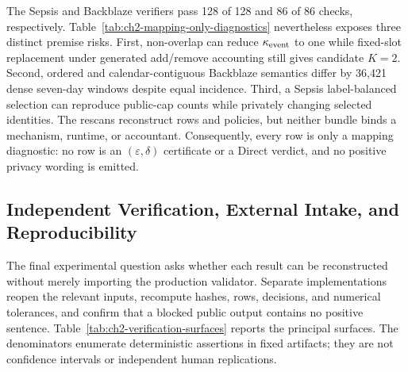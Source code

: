 The Sepsis and Backblaze verifiers pass 128 of 128 and 86 of 86 checks,
respectively.  Table~\ref{tab:ch2-mapping-only-diagnostics} nevertheless exposes
three distinct premise risks.  First, non-overlap can reduce
\(\kappa_{\mathrm{event}}\) to one while fixed-slot replacement under generated
add/remove accounting still gives candidate \(K=2\).  Second, ordered and
calendar-contiguous Backblaze semantics differ by 36,421 dense seven-day windows
despite equal incidence.  Third, a Sepsis label-balanced selection can reproduce
public-cap counts while privately changing selected identities.  The rescans
reconstruct rows and policies, but neither bundle binds a mechanism, runtime, or
accountant.  Consequently, every row is only a mapping diagnostic: no row is an
\((\varepsilon,\delta)\) certificate or a \textsf{Direct} verdict, and no positive
privacy wording is emitted.

\subsection{Independent Verification, External Intake, and Reproducibility}
\label{subsec:ch2-independent-verification}

The final experimental question asks whether each result can be reconstructed
without merely importing the production validator.  Separate implementations
reopen the relevant inputs, recompute hashes, rows, decisions, and numerical
tolerances, and confirm that a blocked public output contains no positive
sentence.  Table~\ref{tab:ch2-verification-surfaces} reports the principal
surfaces.  The denominators enumerate deterministic assertions in fixed artifacts;
they are not confidence intervals or independent human replications.

